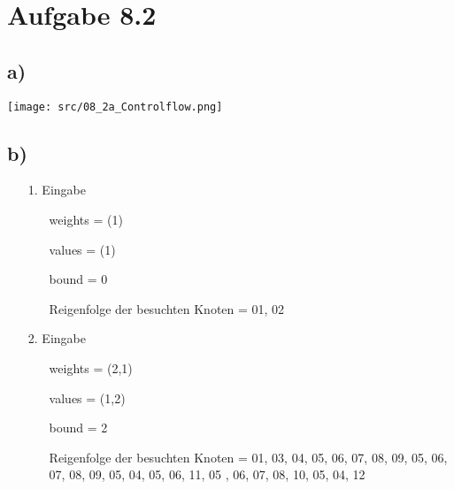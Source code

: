 \documentclass[a4paper,11pt]{scrartcl}
\begin{document}
    \section*{Aufgabe 8.2}
	\subsection*{a)}
	    \texttt{[image: src/08\_2a\_Controlflow.png]}
	\subsection*{b)}
	\begin{enumerate}
		\item[1.] Eingabe
		\begin{itemize}
			\item[] weights = (1)
			\item[] values = (1)
			\item[] bound = 0
			\item[] Reigenfolge der besuchten Knoten = 01, 02
		\end{itemize}
		\item[2.] Eingabe
		\begin{itemize}
			\item[] weights = (2,1)
			\item[] values = (1,2)
			\item[] bound = 2
			\item[] Reigenfolge der besuchten Knoten =  01, 03, 04, 05, 06, 07, 08, 09, 05, 06, 07, 08, 09, 05, 04, 05, 06, 11, 05 , 06, 07, 08, 10, 05, 04, 12
		\end{itemize}
	\end{enumerate}
	
\end{document}
